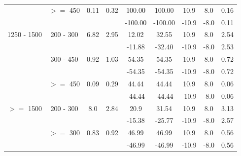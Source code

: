 \begin{table}[htbp]
\begin{center}
\begin{tabular} {c|c|c|c|c|c|c|c|c}
    &  $>=$ 450 & 0.11 & 0.32 & 100.00 & 100.00 & 10.9 & 8.0 & 0.16 \\ 
    & & & & -100.00 & -100.00 & -10.9 & -8.0 & 0.11 \\ 
    \hline
    1250 - 1500 & 200 - 300 & 6.82 & 2.95 & 12.02 & 32.55 & 10.9 & 8.0 & 2.54 \\ 
    & & & & -11.88 & -32.40 & -10.9 & -8.0 & 2.53 \\ 
    & 300 - 450 & 0.92 & 1.03 & 54.35 & 54.35 & 10.9 & 8.0 & 0.72 \\ 
    & & & & -54.35 & -54.35 & -10.9 & -8.0 & 0.72 \\ 
    &  $>=$ 450 & 0.09 & 0.29 & 44.44 & 44.44 & 10.9 & 8.0 & 0.06 \\ 
    & & & & -44.44 & -44.44 & -10.9 & -8.0 & 0.06 \\ 
    \hline
    $>=$ 1500 & 200 - 300 & 8.0 & 2.84 & 20.9 & 31.54 & 10.9 & 8.0 & 3.13 \\ 
    & & & & -15.38 & -25.77 & -10.9 & -8.0 & 2.57 \\ 
    &  $>=$ 300 & 0.83 & 0.92 & 46.99 & 46.99 & 10.9 & 8.0 & 0.56 \\ 
    & & & & -46.99 & -46.99 & -10.9 & -8.0 & 0.56 \\ 
    \hline
    \end{tabular}
  \end{center}
\end{table}

